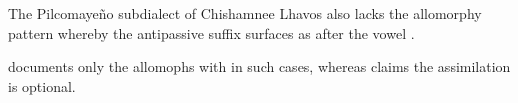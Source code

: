 \begin{exe}
        \ex {} \recind {}
        \ex {} \recind {}
\end{exe}

The Pilcomayeño subdialect of Chishamnee Lhavos also lacks the allomorphy pattern whereby the antipassive suffix  surfaces as  after the vowel  \citep[10]{LC20}.

\ea
    \begin{xlist}
        \ex {} \recind {}
        \ex {} \recind {}
    \end{xlist}
\z
{}
\fussy

\citet{NS87} documents only the allomophs with  in such cases, whereas \citet[48]{AF16} claims the assimilation is optional.
